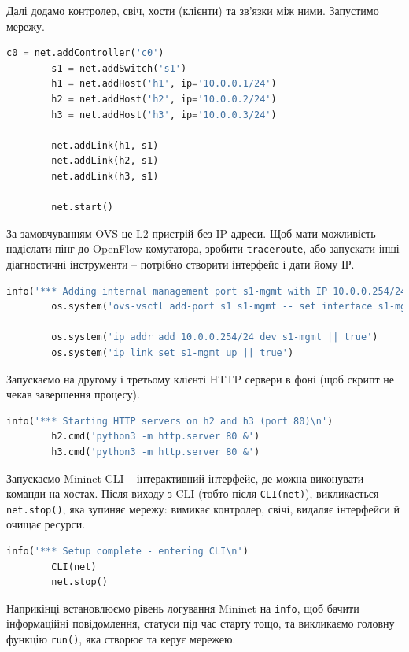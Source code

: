 \documentclass[14pt, a4paper]{extreport}
\begin{document}
	Далі додамо контролер, свіч, хости (клієнти) та зв'язки між ними. Запустимо мережу.
	
	\begin{lstlisting}[language=Python]
		c0 = net.addController('c0')
		s1 = net.addSwitch('s1')
		h1 = net.addHost('h1', ip='10.0.0.1/24')
		h2 = net.addHost('h2', ip='10.0.0.2/24')
		h3 = net.addHost('h3', ip='10.0.0.3/24')
		
		net.addLink(h1, s1)
		net.addLink(h2, s1)
		net.addLink(h3, s1)
		
		net.start()\end{lstlisting}
	
	За замовчуванням OVS це L2-пристрій без IP-адреси. Щоб мати можливість надіслати пінг до OpenFlow-комутатора, зробити \texttt{traceroute}, або запускати інші діагностичні інструменти -- потрібно створити інтерфейс і дати йому ІР.
	
	\begin{lstlisting}[language=Python]
		info('*** Adding internal management port s1-mgmt with IP 10.0.0.254/24\n')
		os.system('ovs-vsctl add-port s1 s1-mgmt -- set interface s1-mgmt type=internal')
		
		os.system('ip addr add 10.0.0.254/24 dev s1-mgmt || true')
		os.system('ip link set s1-mgmt up || true')\end{lstlisting}
	
	Запускаємо на другому і третьому клієнті HTTP сервери в фоні (щоб скрипт не чекав завершення процесу).
	
	\begin{lstlisting}[language=Python]
		info('*** Starting HTTP servers on h2 and h3 (port 80)\n')
		h2.cmd('python3 -m http.server 80 &')
		h3.cmd('python3 -m http.server 80 &')\end{lstlisting}
	
	Запускаємо Mininet CLI -- інтерактивний інтерфейс, де можна виконувати команди на хостах. Після виходу з CLI (тобто після \texttt{CLI(net)}), викликається \texttt{net.stop()}, яка зупиняє мережу: вимикає контролер, свічі, видаляє інтерфейси й очищає ресурси.
	
	\begin{lstlisting}[language=Python]
		info('*** Setup complete - entering CLI\n')
		CLI(net)
		net.stop()\end{lstlisting}
	
	Наприкінці встановлюємо рівень логування Mininet на \texttt{info}, щоб бачити інформаційні повідомлення, статуси під час старту тощо, та викликаємо головну функцію \texttt{run()}, яка створює та керує мережею.
	
\end{document}
